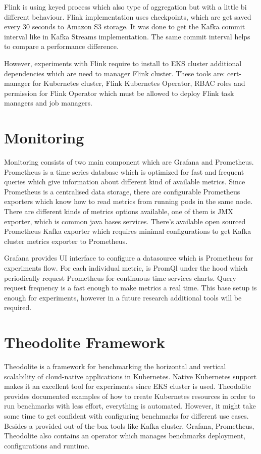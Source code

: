 Flink is using keyed process which also type of aggregation but with a little
bi different behaviour.
Flink implementation uses checkpoints, which are get saved every 30 seconds
to Amazon S3 storage.
It was done to get the Kafka commit interval like in
Kafka Streams implementation.
The same commit interval helps to compare a performance difference.

However, experiments with Flink require to install to EKS cluster additional
dependencies which are need to manager Flink cluster.
These tools are: cert-manager for Kubernetes cluster, Flink Kubernetes Operator,
RBAC roles and permission for Flink Operator which must be allowed to
deploy Flink task managers and job managers.


\section{Monitoring}\label{sec:monitoring-and-benchmarking-setup}
Monitoring consists of two main component which are Grafana and Prometheus.
Prometheus is a time series database which is optimized for fast
and frequent queries which give information about different kind of
available metrics.
Since Prometheus is a centralised data storage, there are configurable
Prometheus exporters which know how to read metrics from running pods
in the same node.
There are different kinds of metrics options available, one of them
is JMX exporter, which is common java bases services.
There's available open sourced Prometheus Kafka exporter which requires
minimal configurations to get Kafka cluster metrics exporter to Prometheus.

Grafana provides UI interface to configure a datasource which is Prometheus
for experiments flow.
For each individual metric, is PromQl under the hood which periodically
request Prometheus for continuous time services charts.
Query request frequency is a fast enough to make metrics a real time.
This base setup is enough for experiments, however in a future research
additional tools will be required.


\section{Theodolite Framework}
Theodolite is a framework for benchmarking the horizontal and vertical scalability
of cloud-native applications in Kubernetes.
Native Kubernetes support makes it an excellent tool for experiments
since EKS cluster is used.
Theodolite provides documented examples of how to create Kubernetes resources
in order to run benchmarks with less effort, everything is automated.
However, it might take some time to get confident with configuring
benchmarks for different use cases.
Besides a provided out-of-the-box tools like Kafka cluster, Grafana, Prometheus,
Theodolite also contains an operator which manages benchmarks deployment,
configurations and runtime.

